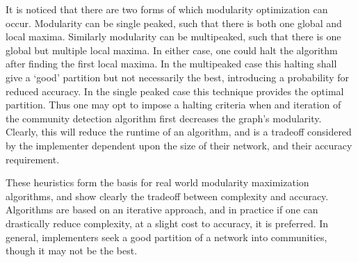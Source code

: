 \documentclass[a4paper, 10pt, twocolumn]{article}
\begin{document}
It is noticed that there are two forms of which modularity optimization can occur.
Modularity can be single peaked, such that there is both one global and local maxima.
Similarly modularity can be multipeaked, such that there is one global but multiple local maxima.
In either case, one could halt the algorithm after finding the first local maxima.
In the multipeaked case this halting shall give a `good' partition but not necessarily the best, introducing a probability for reduced accuracy.
In the single peaked case this technique provides the optimal partition.
Thus one may opt to impose a halting criteria when and iteration of the community detection algorithm first decreases the graph's modularity.
Clearly, this will reduce the runtime of an algorithm, and is a tradeoff considered by the implementer dependent upon the size of their network, and their accuracy requirement.

These heuristics form the basis for real world modularity maximization algorithms, and show clearly the tradeoff between complexity and accuracy.
Algorithms are based on an iterative approach, and in practice if one can drastically reduce complexity, at a slight cost to accuracy, it is preferred.
In general, implementers seek a good partition of a network into communities, though it may not be the best.
\end{document}
